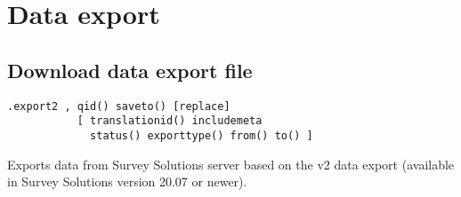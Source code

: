 
\section{Data export}
\subsection{Download data export file}
\begin{lstlisting}[style=CommandLineStyle]
.export2 , qid() saveto() [replace]
           [ translationid() includemeta
             status() exporttype() from() to() ]
\end{lstlisting}

Exports data from Survey Solutions server based on the v2 data export (available in Survey Solutions version 20.07 or newer).

